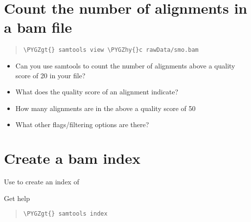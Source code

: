 \documentclass[a4paper,11pt,english]{sphinxmanual}
\def\PYGZgt{\char`\>}
\def\PYGZhy{\char`\-}
\begin{document}
\section{Count the number of alignments in a bam file}
\label{exercises/STEP3_viewManipulateAlignmentData_samtools:count-the-number-of-alignments-in-a-bam-file}\begin{quote}

\begin{Verbatim}[frame=single, rulecolor=\color{lightgray}, fontfamily=courier, commandchars=\\\{\}]
\PYGZgt{} samtools view \PYGZhy{}c rawData/smo.bam
\end{Verbatim}
\end{quote}
\begin{itemize}
\item {} 
Can you use samtools to count the number of alignments above a quality score of 20 in your file?

\item {} 
What does the quality score of an alignment indicate?

\item {} 
How many alignments are in the  above a quality score of 50

\item {} 
What other flags/filtering options are there?

\end{itemize}


\section{Create a bam index}
\label{exercises/STEP3_viewManipulateAlignmentData_samtools:create-a-bam-index}
Use  to create an index of 

Get help
\begin{quote}

\begin{Verbatim}[frame=single, rulecolor=\color{lightgray}, fontfamily=courier, commandchars=\\\{\}]
\PYGZgt{} samtools index
\end{Verbatim}
\end{quote}
\end{document}
